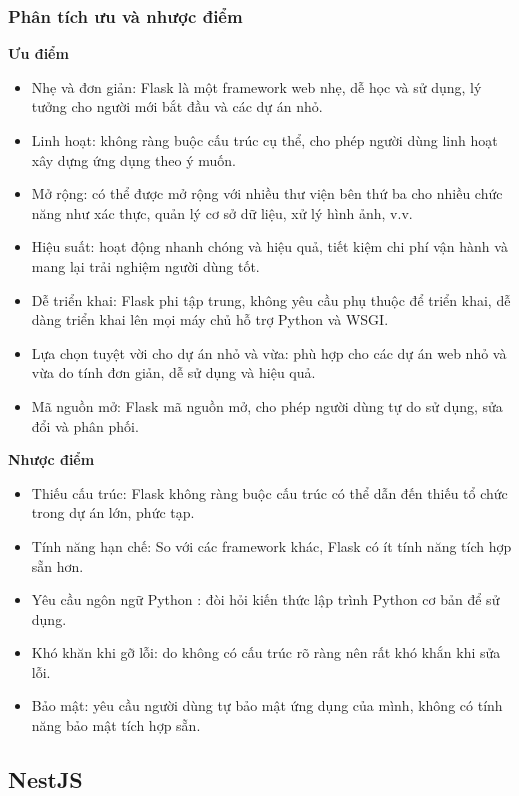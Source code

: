 \subsubsection{Phân tích ưu và nhược điểm}
\textbf{Ưu điểm}
\begin{itemize}
    \item Nhẹ và đơn giản: Flask là một framework web nhẹ, dễ học và sử dụng, lý tưởng cho người mới bắt đầu và các dự án nhỏ.
    \item Linh hoạt: không ràng buộc cấu trúc cụ thể, cho phép người dùng linh hoạt xây dựng ứng dụng theo ý muốn.
    \item Mở rộng: có thể được mở rộng với nhiều thư viện bên thứ ba cho nhiều chức năng như xác thực, quản lý cơ sở dữ liệu, xử lý hình ảnh, v.v.
    \item Hiệu suất: hoạt động nhanh chóng và hiệu quả, tiết kiệm chi phí vận hành và mang lại trải nghiệm người dùng tốt.
    \item Dễ triển khai: Flask phi tập trung, không yêu cầu phụ thuộc để triển khai, dễ dàng triển khai lên mọi máy chủ hỗ trợ Python và WSGI.
    \item Lựa chọn tuyệt vời cho dự án nhỏ và vừa: phù hợp cho các dự án web nhỏ và vừa do tính đơn giản, dễ sử dụng và hiệu quả.
    \item Mã nguồn mở: Flask mã nguồn mở, cho phép người dùng tự do sử dụng, sửa đổi và phân phối.
\end{itemize}
\textbf{Nhược điểm}
\begin{itemize}
    \item Thiếu cấu trúc: Flask không ràng buộc cấu trúc có thể dẫn đến thiếu tổ chức trong dự án lớn, phức tạp.
    \item Tính năng hạn chế: So với các framework khác, Flask có ít tính năng tích hợp sẵn hơn.
    \item Yêu cầu ngôn ngữ Python : đòi hỏi kiến thức lập trình Python cơ bản để sử dụng.
    \item Khó khăn khi gỡ lỗi: do không có cấu trúc rõ ràng nên rất khó khắn khi sửa lỗi.
    \item Bảo mật: yêu cầu người dùng tự bảo mật ứng dụng của mình, không có tính năng bảo mật tích hợp sẵn.
\end{itemize}
\subsection{NestJS}
